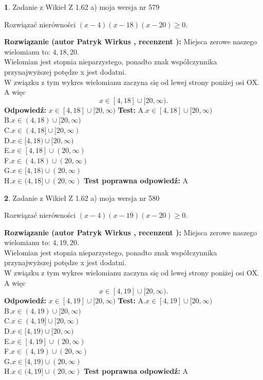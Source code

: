 \documentclass[12pt, a4paper]{article}
\theoremstyle{definition} %
\newtheorem{zad}{}
\newcommand{\zadStart}[1]{\begin{zad}#1\newline}
\newcommand{\zadStop}{\end{zad}}
\newcommand{\rozwStart}[2]{\noindent \textbf{Rozwiązanie (autor #1 , recenzent #2): }\newline}
\newcommand{\rozwStop}{\newline}
\newcommand{\odpStart}{\noindent \textbf{Odpowiedź:}\newline}
\newcommand{\odpStop}{\newline}
\newcommand{\testStart}{\noindent \textbf{Test:}\newline}
\newcommand{\testStop}{\newline}
\newcommand{\kluczStart}{\noindent \textbf{Test poprawna odpowiedź:}\newline}
\newcommand{\kluczStop}{\newline}
\begin{document}
\zadStart{Zadanie z Wikieł Z 1.62 a) moja wersja nr 579}

Rozwiązać nierówności $(x-4)(x-18)(x-20)\ge0$.
\zadStop
\rozwStart{Patryk Wirkus}{}
Miejsca zerowe naszego wielomianu to: $4, 18, 20$.\\
Wielomian jest stopnia nieparzystego, ponadto znak współczynnika przy\linebreak najwyższej potędze x jest dodatni.\\ W związku z tym wykres wielomianu zaczyna się od lewej strony poniżej osi OX. A więc $$x \in [4,18] \cup [20,\infty).$$
\rozwStop
\odpStart
$x \in [4,18] \cup [20,\infty)$
\odpStop
\testStart
A.$x \in [4,18] \cup [20,\infty)$\\
B.$x \in (4,18) \cup [20,\infty)$\\
C.$x \in (4,18] \cup [20,\infty)$\\
D.$x \in [4,18) \cup [20,\infty)$\\
E.$x \in [4,18] \cup (20,\infty)$\\
F.$x \in (4,18) \cup (20,\infty)$\\
G.$x \in [4,18) \cup (20,\infty)$\\
H.$x \in (4,18] \cup (20,\infty)$
\testStop
\kluczStart
A
\kluczStop



\zadStart{Zadanie z Wikieł Z 1.62 a) moja wersja nr 580}

Rozwiązać nierówności $(x-4)(x-19)(x-20)\ge0$.
\zadStop
\rozwStart{Patryk Wirkus}{}
Miejsca zerowe naszego wielomianu to: $4, 19, 20$.\\
Wielomian jest stopnia nieparzystego, ponadto znak współczynnika przy\linebreak najwyższej potędze x jest dodatni.\\ W związku z tym wykres wielomianu zaczyna się od lewej strony poniżej osi OX. A więc $$x \in [4,19] \cup [20,\infty).$$
\rozwStop
\odpStart
$x \in [4,19] \cup [20,\infty)$
\odpStop
\testStart
A.$x \in [4,19] \cup [20,\infty)$\\
B.$x \in (4,19) \cup [20,\infty)$\\
C.$x \in (4,19] \cup [20,\infty)$\\
D.$x \in [4,19) \cup [20,\infty)$\\
E.$x \in [4,19] \cup (20,\infty)$\\
F.$x \in (4,19) \cup (20,\infty)$\\
G.$x \in [4,19) \cup (20,\infty)$\\
H.$x \in (4,19] \cup (20,\infty)$
\testStop
\kluczStart
A
\kluczStop
\end{document}

